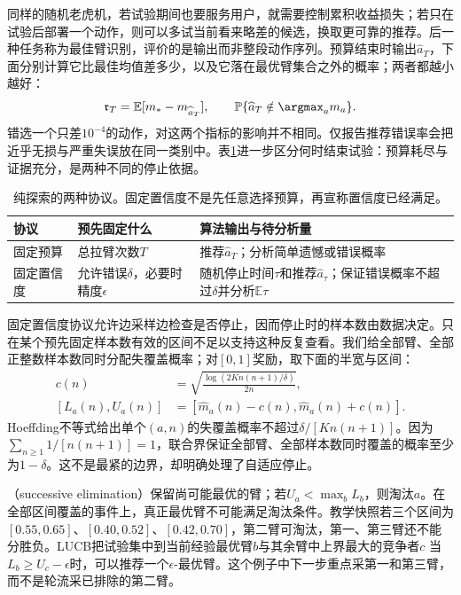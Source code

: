 同样的随机老虎机，若试验期间也要服务用户，就需要控制累积收益损失；若只在试验后部署一个动作，则可以多试当前看来略差的候选，换取更可靠的推荐。后一种任务称为最佳臂识别，评价的是输出而非整段动作序列。预算结束时输出$\widehat a_T$，下面分别计算它比最佳均值差多少，以及它落在最优臂集合之外的概率；两者都越小越好：
\begin{equation}
  \mathfrak r_T=\mathbb E[m_*-m_{\widehat a_T}],
  \qquad
  \mathbb P\{\widehat a_T\notin\argmax_a m_a\}.
  \label{eq:rl-learning-simple-regret}
\end{equation}
错选一个只差$10^{-4}$的动作，对这两个指标的影响并不相同。仅报告推荐错误率会把近乎无损与严重失误放在同一类别中。表\ref{tab:rl-learning-identification-protocols}进一步区分何时结束试验：预算耗尽与证据充分，是两种不同的停止依据。

\begin{table}[htbp]
  \centering
  \small
  \begin{tabularx}{\linewidth}{>{\raggedright\arraybackslash}p{22mm} >{\raggedright\arraybackslash}X >{\raggedright\arraybackslash}X}
    \toprule
    协议 & 预先固定什么 & 算法输出与待分析量 \\
    \midrule
    固定预算 & 总拉臂次数$T$ & 推荐$\widehat a_T$；分析简单遗憾或错误概率 \\
    固定置信度 & 允许错误$\delta$，必要时精度$\epsilon$ & 随机停止时间$\tau$和推荐$\widehat a_\tau$；保证错误概率不超过$\delta$并分析$\mathbb E\tau$ \\
    \bottomrule
  \end{tabularx}
  \caption{纯探索的两种协议。固定置信度不是先任意选择预算，再宣称置信度已经满足。}
  \label{tab:rl-learning-identification-protocols}
\end{table}

固定置信度协议允许边采样边检查是否停止，因而停止时的样本数由数据决定。只在某个预先固定样本数有效的区间不足以支持这种反复查看。我们给全部臂、全部正整数样本数同时分配失覆盖概率；对$[0,1]$奖励，取下面的半宽与区间：
\[
  \begin{aligned}
    c(n)&=\sqrt{\frac{\log(2K n(n+1)/\delta)}{2n}},\\
    [L_a(n),U_a(n)]&=[\widehat m_a(n)-c(n),\widehat m_a(n)+c(n)].
  \end{aligned}
\]
Hoeffding不等式给出单个$(a,n)$的失覆盖概率不超过$\delta/[K n(n+1)]$。因为$\sum_{n\geq1}1/[n(n+1)]=1$，联合界保证全部臂、全部样本数同时覆盖的概率至少为$1-\delta$。这不是最紧的边界，却明确处理了自适应停止。

（successive elimination）保留尚可能最优的臂；若$U_a<\max_b L_b$，则淘汰$a$。在全部区间覆盖的事件上，真正最优臂不可能满足淘汰条件。教学快照若三个区间为$[0.55,0.65]$、$[0.40,0.52]$、$[0.42,0.70]$，第二臂可淘汰，第一、第三臂还不能分胜负。LUCB把试验集中到当前经验最优臂$b$与其余臂中上界最大的竞争者$c$
当$L_b\geq U_c-\epsilon$时，可以推荐一个$\epsilon$-最优臂。这个例子中下一步重点采第一和第三臂，而不是轮流采已排除的第二臂。

